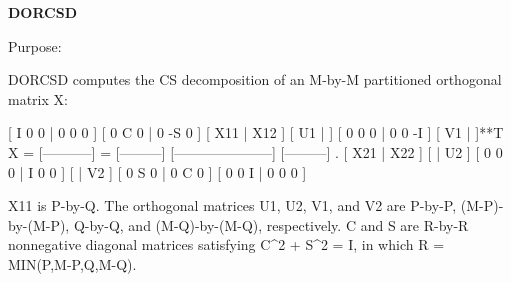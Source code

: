 {\bfseries D\+O\+R\+C\+S\+D} 

 \begin{DoxyParagraph}{Purpose\+: }
\begin{DoxyVerb} DORCSD computes the CS decomposition of an M-by-M partitioned
 orthogonal matrix X:

                                 [  I  0  0 |  0  0  0 ]
                                 [  0  C  0 |  0 -S  0 ]
     [ X11 | X12 ]   [ U1 |    ] [  0  0  0 |  0  0 -I ] [ V1 |    ]**T
 X = [-----------] = [---------] [---------------------] [---------]   .
     [ X21 | X22 ]   [    | U2 ] [  0  0  0 |  I  0  0 ] [    | V2 ]
                                 [  0  S  0 |  0  C  0 ]
                                 [  0  0  I |  0  0  0 ]

 X11 is P-by-Q. The orthogonal matrices U1, U2, V1, and V2 are P-by-P,
 (M-P)-by-(M-P), Q-by-Q, and (M-Q)-by-(M-Q), respectively. C and S are
 R-by-R nonnegative diagonal matrices satisfying C^2 + S^2 = I, in
 which R = MIN(P,M-P,Q,M-Q).\end{DoxyVerb}
 
\end{DoxyParagraph}

